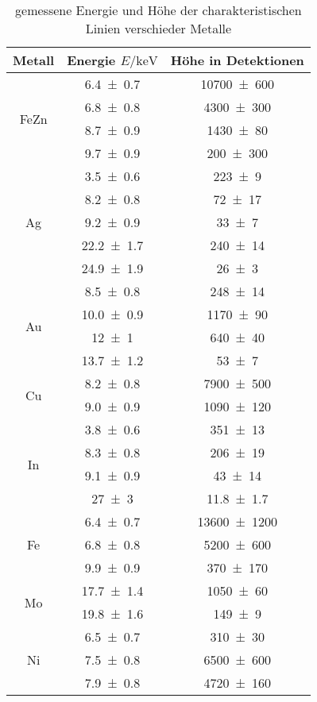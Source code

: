 
\begin{table}[H]
    \centering
    \caption{gemessene Energie und Höhe der charakteristischen Linien verschieder Metalle}
    \label{tab:energien-charakeristische-linien}
    \begin{tabular}{c|c|c}
        Metall & Energie $E/\unit{\kilo\electronvolt}$ & Höhe in Detektionen \\\hline\multirow{4}{*}{FeZn} & \num{6.4\pm 0.7} & \num{10700\pm 600} \\ & \num{6.8\pm 0.8} & \num{4300\pm 300} \\ & \num{8.7\pm 0.9} & \num{1430\pm 80} \\ & \num{9.7\pm 0.9} & \num{200\pm 300} \\\hline
\multirow{5}{*}{Ag} & \num{3.5\pm 0.6} & \num{223\pm 9} \\ & \num{8.2\pm 0.8} & \num{72\pm 17} \\ & \num{9.2\pm 0.9} & \num{33\pm 7} \\ & \num{22.2\pm 1.7} & \num{240\pm 14} \\ & \num{24.9\pm 1.9} & \num{26\pm 3} \\\hline
\multirow{4}{*}{Au} & \num{8.5\pm 0.8} & \num{248\pm 14} \\ & \num{10.0\pm 0.9} & \num{1170\pm 90} \\ & \num{12\pm 1} & \num{640\pm 40} \\ & \num{13.7\pm 1.2} & \num{53\pm 7} \\\hline
\multirow{2}{*}{Cu} & \num{8.2\pm 0.8} & \num{7900\pm 500} \\ & \num{9.0\pm 0.9} & \num{1090\pm 120} \\\hline
\multirow{4}{*}{In} & \num{3.8\pm 0.6} & \num{351\pm 13} \\ & \num{8.3\pm 0.8} & \num{206\pm 19} \\ & \num{9.1\pm 0.9} & \num{43\pm 14} \\ & \num{27\pm 3} & \num{11.8\pm 1.7} \\\hline
\multirow{3}{*}{Fe} & \num{6.4\pm 0.7} & \num{13600\pm 1200} \\ & \num{6.8\pm 0.8} & \num{5200\pm 600} \\ & \num{9.9\pm 0.9} & \num{370\pm 170} \\\hline
\multirow{2}{*}{Mo} & \num{17.7\pm 1.4} & \num{1050\pm 60} \\ & \num{19.8\pm 1.6} & \num{149\pm 9} \\\hline
\multirow{3}{*}{Ni} & \num{6.5\pm 0.7} & \num{310\pm 30} \\ & \num{7.5\pm 0.8} & \num{6500\pm 600} \\ & \num{7.9\pm 0.8} & \num{4720\pm 160} \\\hline

\end{tabular}
\end{table}
